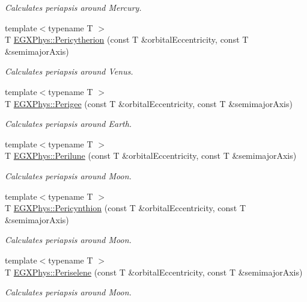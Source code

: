 \begin{DoxyCompactItemize}
\begin{DoxyCompactList}\small\item\em Calculates periapsis around Mercury. \end{DoxyCompactList}\item 
{\footnotesize template$<$typename T $>$ }\\T \hyperlink{group___astrophysics_gaa270e364cbbd7d3d6212872df484926f}{E\+G\+X\+Phys\+::\+Pericytherion} (const T \&orbital\+Eccentricity, const T \&semimajor\+Axis)
\begin{DoxyCompactList}\small\item\em Calculates periapsis around Venus. \end{DoxyCompactList}\item 
{\footnotesize template$<$typename T $>$ }\\T \hyperlink{group___astrophysics_gae2d053caf69cb0b4c3207064a2ab143a}{E\+G\+X\+Phys\+::\+Perigee} (const T \&orbital\+Eccentricity, const T \&semimajor\+Axis)
\begin{DoxyCompactList}\small\item\em Calculates periapsis around Earth. \end{DoxyCompactList}\item 
{\footnotesize template$<$typename T $>$ }\\T \hyperlink{group___astrophysics_ga2cc7ab05e18d32c94d8d74972e032793}{E\+G\+X\+Phys\+::\+Perilune} (const T \&orbital\+Eccentricity, const T \&semimajor\+Axis)
\begin{DoxyCompactList}\small\item\em Calculates periapsis around Moon. \end{DoxyCompactList}\item 
{\footnotesize template$<$typename T $>$ }\\T \hyperlink{group___astrophysics_gaeeba153b188cd06cbd233eaef12f0a6a}{E\+G\+X\+Phys\+::\+Pericynthion} (const T \&orbital\+Eccentricity, const T \&semimajor\+Axis)
\begin{DoxyCompactList}\small\item\em Calculates periapsis around Moon. \end{DoxyCompactList}\item 
{\footnotesize template$<$typename T $>$ }\\T \hyperlink{group___astrophysics_ga255874374dde571531e443cdbef9ef0c}{E\+G\+X\+Phys\+::\+Periselene} (const T \&orbital\+Eccentricity, const T \&semimajor\+Axis)
\begin{DoxyCompactList}\small\item\em Calculates periapsis around Moon. \end{DoxyCompactList}\item 

\end{DoxyCompactItemize}
